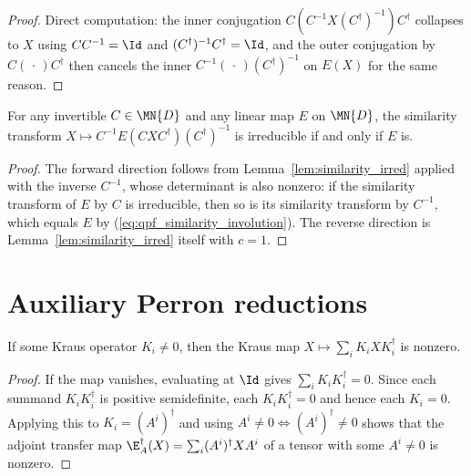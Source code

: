 \begin{proof}\leanok
    Direct computation: the inner conjugation
    $C(C^{-1}X(C^\dagger)^{-1})C^\dagger$ collapses to $X$
    using $CC^{-1} = \Id$ and $(C^\dagger)^{-1}C^\dagger = \Id$, and the
    outer conjugation by $C(\,\cdot\,)C^\dagger$ then cancels the inner
    $C^{-1}(\,\cdot\,)(C^\dagger)^{-1}$ on $E(X)$ for the same reason.
\end{proof}

\begin{lemma}%
    \label{lem:similarity_irred_iff}
    \leanok
    For any invertible $C \in \MN{D}$ and any linear map $E$ on $\MN{D}$,
    the similarity transform
    $X \mapsto C^{-1}E(CXC^\dagger)(C^\dagger)^{-1}$
    is irreducible if and only if $E$ is.
\end{lemma}

\begin{proof}\leanok
    The forward direction follows from Lemma~\ref{lem:similarity_irred}
    applied with the inverse $C^{-1}$, whose determinant is also nonzero:
    if the similarity transform of $E$ by $C$ is irreducible, then so is its
    similarity transform by $C^{-1}$, which equals $E$ by
    (\ref{eq:qpf_similarity_involution}). The reverse direction is
    Lemma~\ref{lem:similarity_irred} itself with $c = 1$.
\end{proof}

\section{Auxiliary Perron reductions}
\label{sec:app_qpf_perron}

\begin{theorem}%
    \label{thm:adjoint_transfer_ne_zero}
    \leanok
    If some Kraus operator $K_i \neq 0$, then the Kraus map
    $X \mapsto \sum_i K_i X K_i^\dagger$ is nonzero.
\end{theorem}

\begin{proof}\leanok
    If the map vanishes, evaluating at $\Id$ gives
    $\sum_i K_i K_i^\dagger = 0$.
    Since each summand $K_i K_i^\dagger$ is positive semidefinite,
    each $K_i K_i^\dagger = 0$ and hence each $K_i = 0$.
    Applying this to $K_i = (A^i)^\dagger$ and using
    $A^i \neq 0 \iff (A^i)^\dagger \neq 0$ shows that the adjoint transfer
    map $\E_A^\dagger(X) = \sum_i (A^i)^\dagger X A^i$ of a tensor with some
    $A^i \neq 0$ is nonzero.
\end{proof}

